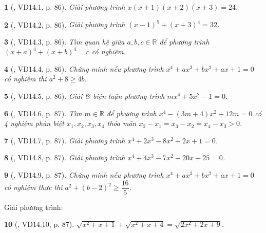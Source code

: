 \documentclass{article}
\newtheorem{baitoan}{}
\begin{document}
\begin{baitoan}[\cite{TLCT_THCS_Toan_9_dai_so}, VD14.1, p. 86]
	Giải phương trình $x(x + 1)(x + 2)(x + 3) = 24$.
\end{baitoan}

\begin{baitoan}[\cite{TLCT_THCS_Toan_9_dai_so}, VD14.2, p. 86]
	Giải phương trình $(x - 1)^5 + (x + 3)^4 = 32$.
\end{baitoan}

\begin{baitoan}[\cite{TLCT_THCS_Toan_9_dai_so}, VD14.3, p. 86]
	Tìm quan hệ giữa $a,b,c\in\mathbb{R}$ để phương trình $(x + a)^4 + (x + b)^4 = c$ có nghiệm.
\end{baitoan}

\begin{baitoan}[\cite{TLCT_THCS_Toan_9_dai_so}, VD14.4, p. 86]
	Chứng minh nếu phương trình $x^4 + ax^3 + bx^2 + ax + 1 = 0$ có nghiệm thì $a^2 + 8\ge4b$.
\end{baitoan}

\begin{baitoan}[\cite{TLCT_THCS_Toan_9_dai_so}, VD14.5, p. 86]
	Giải \& biện luận phương trình $mx^4 + 5x^2 - 1 = 0$.
\end{baitoan}

\begin{baitoan}[\cite{TLCT_THCS_Toan_9_dai_so}, VD14.6, p. 87]
	Tìm $m\in\mathbb{R}$ để phương trình $x^4 - (3m + 4)x^2 + 12m = 0$ có 4 nghiệm phân biệt $x_1,x_2,x_3,x_4$ thỏa mãn $x_2 - x_1 = x_3 - x_2 = x_4 - x_3 > 0$.
\end{baitoan}

\begin{baitoan}[\cite{TLCT_THCS_Toan_9_dai_so}, VD14.7, p. 87]
	Giải phương trình $x^4 + 2x^3 - 8x^2 + 2x + 1 = 0$.
\end{baitoan}

\begin{baitoan}[\cite{TLCT_THCS_Toan_9_dai_so}, VD14.8, p. 87]
	Giải phương trình $x^4 + 4x^3 - 7x^2 - 20x + 25 = 0$.
\end{baitoan}

\begin{baitoan}[\cite{TLCT_THCS_Toan_9_dai_so}, VD14.9, p. 87]
	Chứng minh nếu phương trình $x^4 + ax^3 + bx^2 + ax + 1 = 0$ có nghiệm thực thì $a^2 + (b - 2)^2\ge\dfrac{16}{5}$.
\end{baitoan}
Giải phương trình:
	
\begin{baitoan}[\cite{TLCT_THCS_Toan_9_dai_so}, VD14.10, p. 87]
	$\sqrt{x^2 + x + 1} + \sqrt{x^2 + x + 4} = \sqrt{2x^2 + 2x + 9}$.
\end{baitoan}
\end{document}
